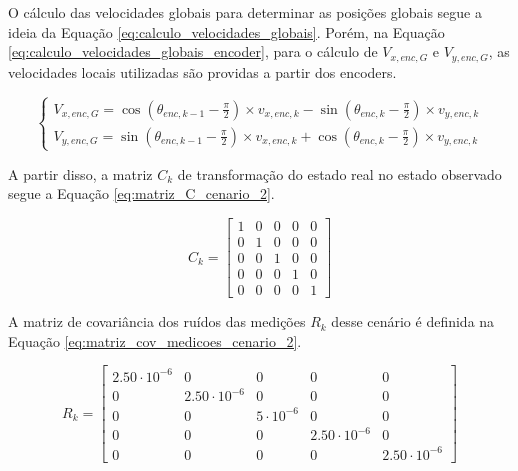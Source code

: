 \documentclass[acronym, symbols, table, deposito]{fei}
\begin{document}
			O cálculo das velocidades globais para determinar as posições globais segue a ideia da Equação \eqref{eq:calculo_velocidades_globais}. Porém, na Equação \eqref{eq:calculo_velocidades_globais_encoder}, para o cálculo de $V_{x,enc,G}$ e $V_{y,enc,G}$, as velocidades locais utilizadas são providas a partir dos encoders.
			
				\begin{equation}\label{eq:calculo_velocidades_globais_encoder}
					\begin{cases}
						V_{x,enc,G} = \cos(\theta_{enc,k-1} - \frac{\pi}{2}) \times v_{x,enc,k} - \sin(\theta_{enc,k} - \frac{\pi}{2}) \times v_{y,enc,k} \\
						V_{y,enc,G} = \sin(\theta_{enc,k-1} - \frac{\pi}{2}) \times v_{x,enc,k} + \cos(\theta_{enc,k} - \frac{\pi}{2}) \times v_{y,enc,k}
					\end{cases}
				\end{equation}
			
			A partir disso, a matriz $C_{k}$ de transformação do estado real no estado observado segue a Equação \eqref{eq:matriz_C_cenario_2}.
			
			\begin{equation}\label{eq:matriz_C_cenario_2}
				C_{k} = \begin{bmatrix}
					1 & 0 & 0 & 0 & 0 \\
					0 & 1 & 0 & 0 & 0 \\
					0 & 0 & 1 & 0 & 0 \\
					0 & 0 & 0 & 1 & 0 \\
					0 & 0 & 0 & 0 & 1
				\end{bmatrix}
			\end{equation}
			
			A matriz de covariância dos ruídos das medições $R_{k}$ desse cenário é definida na Equação \eqref{eq:matriz_cov_medicoes_cenario_2}.
			
			\begin{equation}\label{eq:matriz_cov_medicoes_cenario_2}
				R_{k} = \begin{bmatrix}
					2.50\cdot10^{-6} & 0 & 0 & 0 & 0 \\
					0 & 2.50\cdot10^{-6} & 0 & 0 & 0 \\
					0 & 0 & 5\cdot10^{-6} & 0 & 0 \\
					0 & 0 & 0 & 2.50\cdot10^{-6} & 0 \\
					0 & 0 & 0 & 0 & 2.50\cdot10^{-6}
				\end{bmatrix}
			\end{equation}
		
\end{document}
